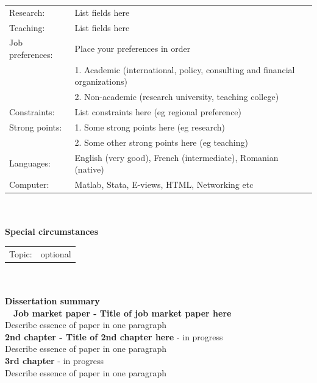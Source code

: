 \documentclass[12pt]{article}
\begin{document}
\begin{tabular}{l p{5in}}
Research: & List fields here\vspace{1mm}\\
Teaching: & List fields here\vspace{1mm}\\
Job preferences: & Place your preferences in order\vspace{1mm}\\
& 1. Academic (international, policy, consulting and financial organizations)\vspace{1mm}\\
& 2. Non-academic (research university, teaching college)\vspace{o1mm}\\
Constraints: & List constraints here (eg regional preference)\vspace{1mm}\\
Strong points: & 1. Some strong points here (eg research)\vspace{1mm}\\
& 2. Some other strong points here (eg teaching)\vspace{1mm}\\
Languages: & English (very good), French (intermediate),
Romanian (native)\vspace{1mm}\\
Computer: & Matlab, Stata, E-views, HTML,
Networking etc\vspace{1mm}\\ %
\end{tabular}
\\
\\
\textbf{\large{Special circumstances}}\vspace{3mm} \\
\begin{tabular}{l p{5in}}
Topic: & optional\vspace{1mm}\\
\end{tabular}
\\
\\
\textbf{\large{Dissertation summary}} \vspace{2mm}\\
\
\
\textbf{Job market paper - Title of job market paper here}\vspace{2mm}\\
Describe essence of paper in one paragraph\\

\textbf{2nd chapter - Title of 2nd chapter here} - in progress\vspace{2mm}\\
Describe essence of paper in one paragraph\\

\textbf{3rd chapter} - in progress\vspace{2mm}\\
Describe essence of paper in one paragraph\\
\end{document}
